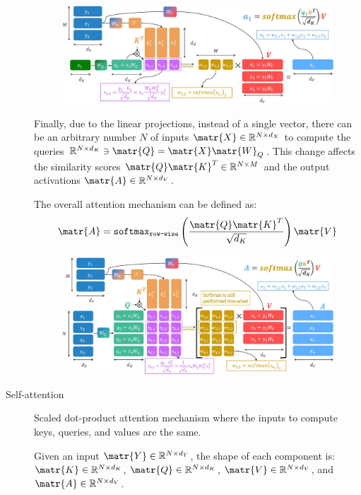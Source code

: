 \begin{description}
        \begin{figure}[H]
            \centering
            \includegraphics[width=0.8\linewidth]{./img/_scaled_dot_attention.jpg}
        \end{figure}

        Finally, due to the linear projections, instead of a single vector, there can be an arbitrary number $N$ of inputs $\matr{X} \in \mathbb{R}^{N \times d_X}$ to compute the queries $\mathbb{R}^{N \times d_K} \ni \matr{Q} = \matr{X} \matr{W}_Q$. This change affects the similarity scores $\matr{Q}\matr{K}^T \in \mathbb{R}^{N \times M}$ and the output activations $\matr{A} \in \mathbb{R}^{N \times d_V}$. 

        The overall attention mechanism can be defined as:
        \[ \matr{A} = \texttt{softmax}_\texttt{row-wise}\left( \frac{\matr{Q}\matr{K}^T}{\sqrt{d_K}} \right) \matr{V} \]

        \begin{figure}[H]
            \centering
            \includegraphics[width=0.8\linewidth]{./img/_scaled_dot_attention_multi_q.jpg}
        \end{figure}

    \item[Self-attention] 
        Scaled dot-product attention mechanism where the inputs to compute keys, queries, and values are the same.

        Given an input $\matr{Y} \in \mathbb{R}^{N \times d_Y}$, the shape of each component is: $\matr{K} \in \mathbb{R}^{N \times d_K}$, $\matr{Q} \in \mathbb{R}^{N \times d_K}$, $\matr{V} \in \mathbb{R}^{N \times d_V}$, and $\matr{A} \in \mathbb{R}^{N \times d_V}$.


\end{description}
